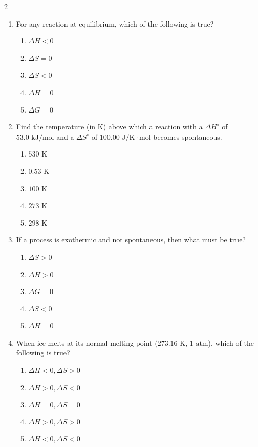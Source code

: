 \documentclass[12pt,letterpaper]{article}
\begin{document}
\begin{multicols*}{2}
\begin{enumerate}
        \item For any reaction at equilibrium, which of the following is true? %
            \begin{enumerate}
                \item $\Delta H < 0$
                \item $\Delta S = 0$
                \item $\Delta S < 0$
                \item $\Delta H = 0$
                \item $\Delta G = 0$
            \end{enumerate}

        \item Find the temperature (in $\text{K}$) above which a reaction with a $\Delta H^\circ$ of $53.0\text{ kJ/mol}$ and a $\Delta S^\circ$ of $100.00\text{ J/K}\cdot\text{mol}$ becomes spontaneous. %
            \begin{enumerate}
                \item $530\text{ K}$
                \item $0.53\text{ K}$
                \item $100\text{ K}$
                \item $273\text{ K}$
                \item $298\text{ K}$
            \end{enumerate}

        \item If a process is exothermic and not spontaneous, then what must be true? %
            \begin{enumerate}
                \item $\Delta S > 0$
                \item $\Delta H > 0$
                \item $\Delta G = 0$
                \item $\Delta S < 0$
                \item $\Delta H = 0$
            \end{enumerate}

        \item When ice melts at its normal melting point ($273.16\text{ K}$, $1\text{ atm}$), which of the following is true? %
            \begin{enumerate}
                \item $\Delta H < 0, \Delta S > 0$
                \item $\Delta H > 0, \Delta S < 0$
                \item $\Delta H = 0, \Delta S = 0$
                \item $\Delta H > 0, \Delta S > 0$
                \item $\Delta H < 0, \Delta S < 0$
            \end{enumerate}
    \end{enumerate}
\end{multicols*}
\end{document}
